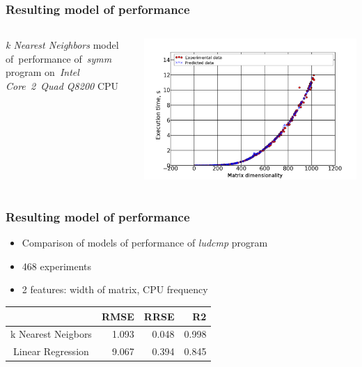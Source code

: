 \documentclass{beamer}
\begin{document}
\begin{frame}
\frametitle{Resulting model of performance}
	\begin{columns}
		\begin{column}{0.3\textwidth}
			\textit{k Nearest Neighbors} model of~performance of~\textit{symm} program on~\textit{Intel Core~2~Quad Q8200} CPU
		\end{column}
		\begin{column}{0.7\textwidth}
			\includegraphics[scale=0.2]{symm-knn-q8200}
		\end{column}
	\end{columns}
\end{frame}

\begin{frame}
\frametitle{Resulting model of performance}

	\begin{itemize}
		\item Comparison of models of performance of \textit{ludcmp} program	
		\item 468 experiments
		\item 2 features: width of matrix, CPU frequency
	\end{itemize}
	
	\begin{center}
	\begin{tabular}{|c|r|r|r|}
	\hline 
	 & RMSE & RRSE & R2 \\ 
	\hline 
	k Nearest Neigbors & 1.093 & 0.048 & 0.998 \\ 
	Linear Regression & 9.067 & 0.394 & 0.845 \\ 
	\hline
	\end{tabular}
	\end{center}

\end{frame}
\end{document}
